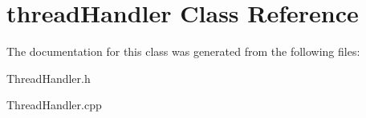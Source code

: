 \hypertarget{classthread_handler}{}\section{thread\+Handler Class Reference}
\label{classthread_handler}


The documentation for this class was generated from the following files\+:\begin{DoxyCompactItemize}
\item 
Thread\+Handler.\+h\item 
Thread\+Handler.\+cpp\end{DoxyCompactItemize}
